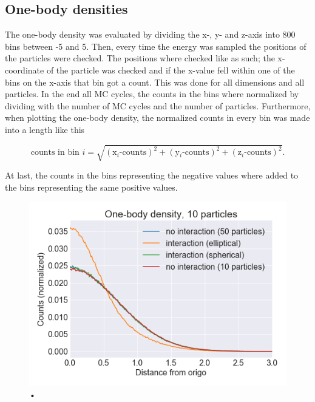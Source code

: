 \subsection{One-body densities}

The one-body density was evaluated by dividing the x-, y- and z-axis into 800 bins between -5 and 5. Then, every time the energy was sampled the positions of the particles were checked. The positions where checked like as such; the x-coordinate of the particle was checked and if the x-value fell within one of the bins on the x-axis that bin got a count. This was done for all dimensions and all particles. In the end all MC cycles, the counts in the bins where normalized by dividing with the number of MC cycles and the number of particles. Furthermore, when plotting the one-body density, the normalized counts in every bin was made into a length like this

$$\text{counts in bin $i$} =  \sqrt{ (\text{x$_i$-counts})^2 + (\text{y$_i$-counts})^2 + (\text{z$_i$-counts})^2}.$$

At last, the counts in the bins representing the negative values where added to the bins representing the same positive values.

\begin{figure}
\center
\includegraphics[width=0.7\linewidth]{../Results/one_body_density_10p}\caption{•}\label{fig:one_body_densityN_10}
\end{figure}

